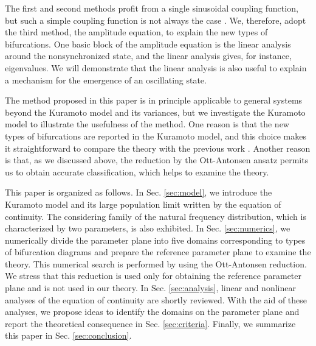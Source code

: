 The first and second methods profit from a single sinusoidal coupling function,
but such a simple coupling function is not always the case
\cite{hansel-mato-meunier-93,crawford1995,kiss-zhai-hudson-05,kiss-zhai-hudson-06}.
We, therefore, adopt the third method, the amplitude equation,
to explain the new types of bifurcations.
One basic block of the amplitude equation is the linear analysis
around the nonsynchronized state,
and the linear analysis gives, for instance,
eigenvalues.
We will demonstrate that the linear analysis is also useful
to explain a mechanism for the emergence of an oscillating state.


The method proposed in this paper is in principle applicable to general systems
beyond the Kuramoto model and its variances,
but we investigate the Kuramoto model 
to illustrate the usefulness of the method.
One reason is that the new types of bifurcations are reported
in the Kuramoto model, and this choice makes it straightforward
to compare the theory with the previous work
\cite{terada2017}.
Another reason is that, as we discussed above,
the reduction by the Ott-Antonsen ansatz
permits us to obtain accurate classification,
which helps to examine the theory.

This paper is organized as follows.
In Sec. \ref{sec:model}, we introduce the Kuramoto model
and its large population limit
written by the equation of continuity.
The considering family of the natural frequency distribution,
which is characterized by two parameters, is also exhibited.
In Sec. \ref{sec:numerics}, we numerically divide the parameter plane 
into five domains corresponding to types of bifurcation diagrams
and prepare the reference parameter plane to examine the theory.
This numerical search is performed by using the Ott-Antonsen reduction.
We stress that this reduction is used only for obtaining
the reference parameter plane and is not used in our theory.
In Sec. \ref{sec:analysis}, linear and nonlinear analyses
of the equation of continuity are shortly reviewed.
With the aid of these analyses,
we propose ideas to identify the domains on the parameter plane
and report the theoretical consequence in Sec. \ref{sec:criteria}.
Finally, we summarize this paper in Sec. \ref{sec:conclusion}.


